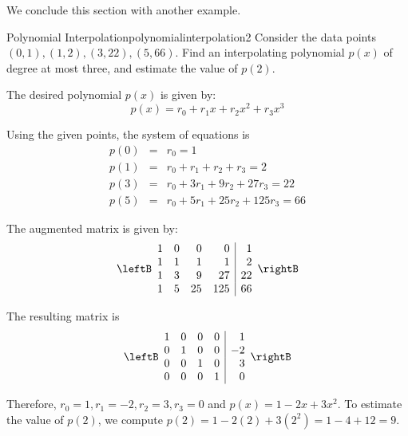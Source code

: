 We conclude this section with another example. 

\begin{example}{Polynomial Interpolation}{polynomialinterpolation2}
Consider the data points $(0,1), (1,2), (3,22), (5,66)$. Find an interpolating polynomial $p(x)$ of degree at most three, and estimate the value of $p(2)$. 
\end{example}

\begin{solution}
The desired polynomial $p(x)$ is given by:
\[
p(x) = r_0 + r_1 x + r_2x^2 + r_3x^3
\]

Using the given points, the system of equations is
\begin{eqnarray*}
p(0) &=& r_0 = 1 \\
p(1) &=& r_0 + r_1 + r_2 + r_3 = 2 \\
p(3) &=& r_0 + 3r_1 + 9r_2 + 27r_3 = 22 \\
p(5) &=& r_0 + 5r_1 + 25r_2 + 125r_3 = 66
\end{eqnarray*}

The augmented matrix is given by:
\[
\leftB
\begin{array}{rrrr|r}
1 & 0 & 0 & 0 & 1 \\
1 & 1 & 1 & 1 & 2 \\
1 & 3 & 9 & 27 & 22 \\
1 & 5 & 25 & 125 & 66
\end{array}
\rightB
\]

The resulting matrix is 
\[
\leftB
\begin{array}{rrrr|r}
1 & 0 & 0 & 0 & 1 \\
0 & 1 & 0 & 0 & -2 \\
0 & 0 & 1 & 0 & 3 \\
0 & 0 & 0 & 1 & 0
\end{array}
\rightB
\]

Therefore, $r_0 = 1, r_1 = -2, r_2 = 3, r_3 = 0$ and $p(x) = 1 -2x + 3x^2$. To estimate the value of $p(2)$, we compute $p(2) = 1 -2(2) + 3(2^2) = 1 - 4 + 12 = 9$.
\end{solution}